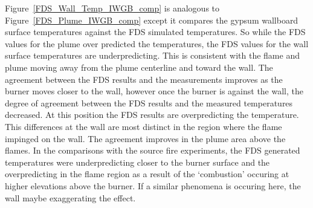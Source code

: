 \documentclass[twoside]{uocthesis}
\begin{document}
{Figure~\ref{FDS_Wall_Temp_IWGB_comp} is analogous to Figure~\ref{FDS_Plume_IWGB_comp} except it compares the gypsum wallboard surface temperatures against the FDS simulated temperatures.  So while the FDS values for the plume over predicted the temperatures, the FDS values for the wall surface temperatures are underpredicting.  This is consistent with the flame and plume moving away from the plume centerline and toward the wall.  The agreement between the FDS results and the measurements improves as the burner moves closer to the wall, however once the burner is against the wall, the degree of agreement between the FDS results and the measured temperatures decreased.  At this position the FDS results are overpredicting the temperature. This differences at the wall are most distinct in the region where the flame impinged on the wall.  The agreement improves in the plume area above the flames.  In the comparisons with the source fire experiments, the FDS generated temperatures were underpredicting closer to the burner surface and the overpredicting in the flame region as a result of the `combustion' occuring at higher elevations above the burner.  If a similar phenomena is occuring here, the wall maybe exaggerating the effect.      

}
\end{document}
